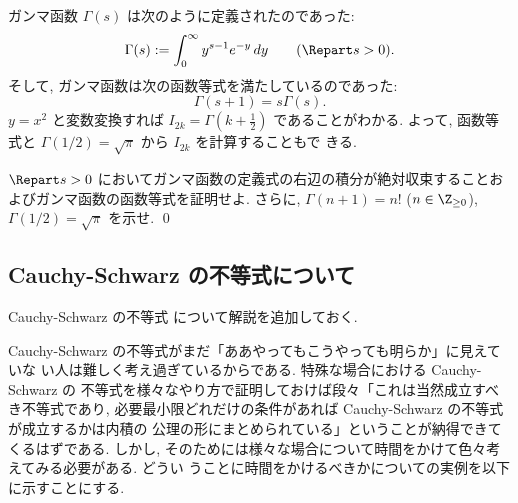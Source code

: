 \documentclass[12pt,twoside]{jarticle}
\begin{document}

\medskip

ガンマ函数 $\Gamma(s)$ は次のように定義されたのであった:
\begin{equation*}
  \Gamma(s) := \int_0^\infty y^{s-1} e^{-y}\,dy
  \qquad (\Repart s > 0).
\end{equation*}
そして, ガンマ函数は次の函数等式を満たしているのであった:
\begin{equation*}
  \Gamma(s+1) = s\Gamma(s).
\end{equation*}
$y=x^2$ と変数変換すれば $I_{2k} = \Gamma(k+\frac{1}{2})$ であることがわかる.
よって, 函数等式と $\Gamma(1/2)=\sqrt{\pi}$ から $I_{2k}$ を計算することもで
きる.

\begin{question}[10点]
\label{q:Gamma-function}
  $\Repart s > 0$ においてガンマ函数の定義式の右辺の積分が絶対収束することお
  よびガンマ函数の函数等式を証明せよ. 
  さらに, $\Gamma(n+1)=n!$ ($n\in\Z_{\ge0}$), $\Gamma(1/2)=\sqrt{\pi}$ を示せ.
  \qed
\end{question}


\subsection{Cauchy-Schwarz の不等式について}
\label{sec:Cauchy-Schwarz}

Cauchy-Schwarz の不等式  について解説を追加しておく.

Cauchy-Schwarz の不等式がまだ「ああやってもこうやっても明らか」に見えていな
い人は難しく考え過ぎているからである.  特殊な場合における Cauchy-Schwarz の
不等式を様々なやり方で証明しておけば段々「これは当然成立すべき不等式であり, 
必要最小限どれだけの条件があれば Cauchy-Schwarz の不等式が成立するかは内積の
公理の形にまとめられている」ということが納得できてくるはずである.  しかし,
そのためには様々な場合について時間をかけて色々考えてみる必要がある.  どうい
うことに時間をかけるべきかについての実例を以下に示すことにする.
\end{document}
